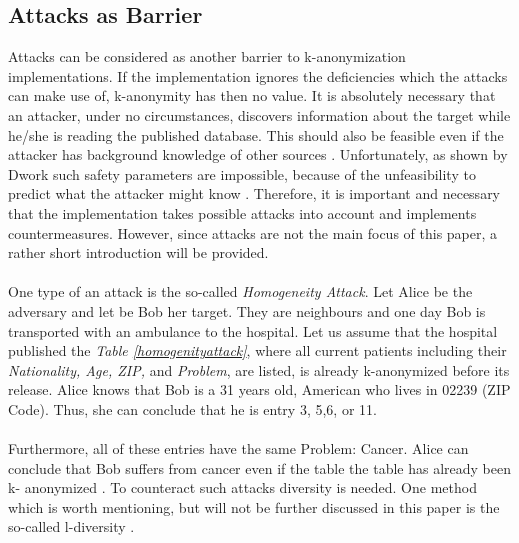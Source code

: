 \documentclass{llncs}
\begin{document}
\subsection{Attacks as Barrier}

Attacks can be considered as another barrier to k-anonymization implementations. If the implementation ignores the deficiencies which the attacks can make use of, k-anonymity has then no value. It is absolutely necessary that an attacker, under no circumstances, discovers information about the target while he/she is reading the published database. This should also be feasible even if the attacker has background knowledge of other sources   \cite{Dalenius1977}. Unfortunately, as shown by Dwork such safety parameters are impossible, because of the unfeasibility to predict what the attacker might know \cite{dwork2011differential}. Therefore, it is important and necessary that the implementation takes possible attacks into account and implements countermeasures. However, since attacks are not the main focus of this paper, a rather short introduction will be provided.\\\\
One type of an attack is the so-called \textit{Homogeneity Attack}. Let Alice be the adversary and let be Bob her target. They are neighbours and one day Bob is transported with an ambulance to the hospital. Let us assume that the hospital published the \textit{Table \ref{homogenityattack}}, where all current patients including their \textit{Nationality, Age, ZIP,} and \textit{Problem}, are listed, is already k-anonymized before its release. Alice knows that Bob is a 31 years old, American who lives in 02239 (ZIP Code). Thus, she can conclude that he is entry 3, 5,6, or 11.\\\\
Furthermore, all of these entries have the same Problem: Cancer. Alice can conclude that Bob suffers from cancer even if the table the table has already been k- anonymized  \cite{sweeney2002k,ldiversity}. To counteract such attacks diversity is needed. One method which is worth mentioning, but will not be further discussed in this paper is the so-called l-diversity \cite{ldiversity}.  
\end{document}
